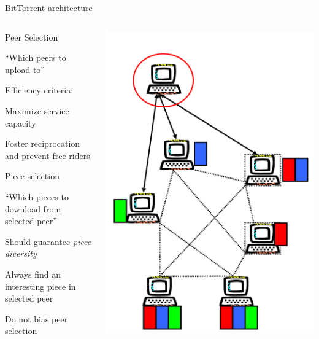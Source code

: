 \begin{frame}{BitTorrent architecture}

\begin{columns}
\begin{column}{0.60\textwidth}
\BIL
\item \alert{Peer Selection}
	\BI
	\item “Which peers to upload to”
	\item Efficiency criteria:
		\BI
		\item Maximize service capacity
		\item Foster reciprocation and prevent free riders
		\EI
	\EI
\item \alert{Piece selection}
	\BI
	\item “Which pieces to download from selected peer”
	\item Should guarantee \textit{piece diversity}
		\BI
		\item Always find an interesting piece in selected peer
		\item Do not bias peer selection
		\EI
	\EI
\EIL
\end{column}	
\begin{column}{0.38\textwidth}
\includegraphics[width=\textwidth]{bt-arch2}	
\end{column}
\end{columns}
\end{frame}


